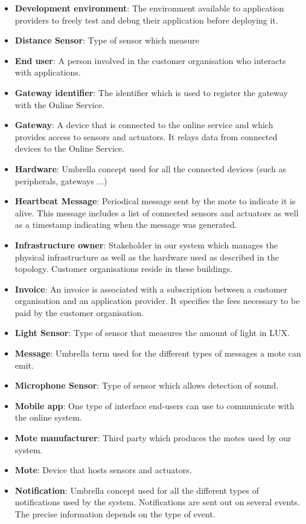 \documentclass[english]{sareport}
\begin{document}
\begin{itemize}
	\item \textbf{Development environment}: The environment available to application providers to freely test and debug their application before deploying it.
	\item \textbf{Distance Sensor}: Type of sensor which measure 
	\item \textbf{End user}: A person involved in the customer organisation who interacts with applications.
	\item \textbf{Gateway identifier}: The identifier which is used to register the gateway with the Online Service.
	\item \textbf{Gateway}: A device that is connected to the online service and which provides access to sensors and actuators. It relays data from connected devices to the Online Service.
	\item \textbf{Hardware}: Umbrella concept used for all the connected devices (such as peripherals, gateways ...)
	\item \textbf{Heartbeat Message}: Periodical message sent by the mote to indicate it is alive. This message includes a list of connected sensors and actuators as well as a timestamp indicating when the message was generated.
	\item \textbf{Infrastructure owner}: Stakeholder in our system which manages the physical infrastructure as well as the hardware used as described in the topology. Customer organisations reside in these buildings.
	\item \textbf{Invoice}: An invoice is associated with a subscription between a customer organisation and an application provider. It specifies the fees necessary to be paid by the customer organisation.
	\item \textbf{Light Sensor}: Type of sensor that measures the amount of light in LUX.
	\item \textbf{Message}: Umbrella term used for the different types of messages a mote can emit.
	\item \textbf{Microphone Sensor}: Type of sensor which allows detection of sound. 
	\item \textbf{Mobile app}: One type of interface end-users can use to communicate with the online system.
	\item \textbf{Mote manufacturer}: Third party which produces the motes used by our system.
	\item \textbf{Mote}: Device that hosts sensors and actuators.
	\item \textbf{Notification}: Umbrella concept used for all the different types of notifications used by the system. Notifications are sent out on several events. The precise information depends on the type of event.

\end{itemize}
\end{document}
